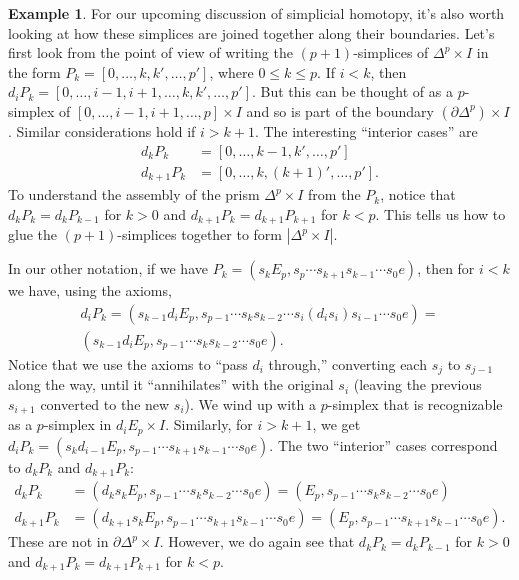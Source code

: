 \documentclass[12pt]{article}
\theoremstyle{plain}
\theoremstyle{definition}
\newtheorem{example}[theorem]{Example}
\newcommand{\bd}{\partial}
\begin{document}
\begin{example}
For our upcoming discussion of simplicial homotopy, it's also worth looking at how these simplices are joined together along their boundaries. Let's first look from the point of view of writing the $(p+1)$-simplices of $\Delta^p\times I$ in the form $P_k=[0,\ldots, k,k',\ldots, p']$, where $0\leq k\leq p$. If $i<k$, then $d_iP_k=[0,\ldots,i-1,i+1,\ldots,k,k',\ldots, p']$. But this can be thought of as a $p$-simplex of $[0,\ldots,i-1,i+1,\ldots, p]\times I$ and so is part of the boundary $(\bd \Delta^p)\times I$. Similar considerations hold if $i>k+1$. The interesting ``interior cases'' are
\begin{align*}
d_kP_k&=[0,\ldots,k-1,k',\ldots,p']\\
d_{k+1}P_k&=[0,\ldots,k,(k+1)',\ldots,p'].
\end{align*}
To understand the assembly of the prism $\Delta^p\times I$ from the $P_k$,  notice that $d_kP_k=d_kP_{k-1}$ for $k>0$ and $d_{k+1}P_k=d_{k+1} P_{k+1}$ for $k<p$. This tells us how to glue the $(p+1)$-simplices together to form $|\Delta^p\times I|$. 

In our other notation, if we have 
$P_k=(s_k E_p, s_{p}\cdots s_{k+1}s_{k-1} \cdots s_{0} e)$, then for $i<k$ we have, using the axioms, 
\begin{multline*}
d_iP_k=(s_{k-1}d_i E_p, s_{p-1}\cdots  s_{k}s_{k-2}\cdots s_i (d_is_i)s_{i-1}\cdots s_{0} e)=\\
(s_{k-1}d_i E_p, s_{p-1}\cdots s_{k}s_{k-2} \cdots s_{0} e).
\end{multline*}
Notice that we use the axioms to   ``pass $d_i$ through,'' converting each $s_j$ to $s_{j-1}$ along the way, until it ``annihilates'' with the original $s_i$ (leaving the previous $s_{i+1}$ converted to the new $s_i$). We wind up with a $p$-simplex that is recognizable as a $p$-simplex in $d_iE_p\times I$. Similarly, for $i>k+1$, we get $d_iP_k=(s_{k}d_{i-1} E_p, s_{p-1}\cdots s_{k+1}s_{k-1} \cdots s_{0} e)$. The two ``interior'' cases correspond to $d_kP_k$ and $d_{k+1}P_k$:
\begin{align*}
d_kP_k&=(d_ks_k E_p, s_{p-1}\cdots s_{k}s_{k-2} \cdots s_{0} e)=(E_p, s_{p-1}\cdots s_{k}s_{k-2} \cdots s_{0} e)\\
d_{k+1}P_k&=(d_{k+1}s_k E_p, s_{p-1}\cdots s_{k+1}s_{k-1} \cdots s_{0} e)=(E_p, s_{p-1}\cdots s_{k+1}s_{k-1} \cdots s_{0} e).
\end{align*}
These are not in $\bd \Delta^p\times I$. However, we do again see that $d_kP_k=d_kP_{k-1}$ for $k>0$ and $d_{k+1}P_k=d_{k+1} P_{k+1}$ for $k<p$.
\end{example}
\end{document}
